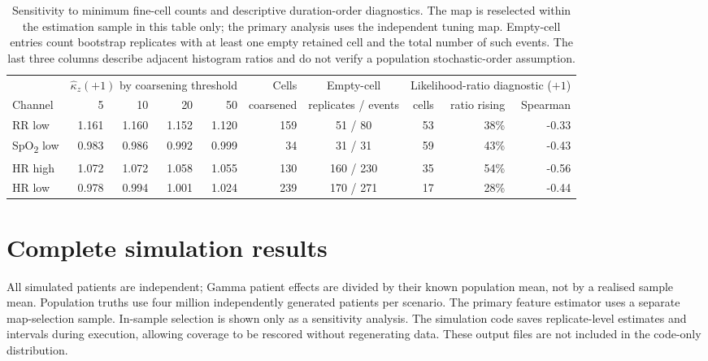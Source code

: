 \documentclass[11pt,letterpaper]{article}
\newcommand{\SpO}{SpO\textsubscript{2}}\newcommand{\tightnote}[1]{\par\smallskip{\footnotesize\raggedright #1\par}}
\begin{document}
\begin{table}[htbp]\centering\footnotesize
\setlength{\tabcolsep}{4pt}
\caption{Sensitivity to minimum fine-cell counts and descriptive duration-order diagnostics. The map is reselected within the estimation sample in this table only; the primary analysis uses the independent tuning map. Empty-cell entries count bootstrap replicates with at least one empty retained cell and the total number of such events. The last three columns describe adjacent histogram ratios and do not verify a population stochastic-order assumption.}
\label{tab:impl}
\begin{tabular}{@{}lrrrrrcrrr@{}}
\toprule
 & \multicolumn{4}{c}{$\hat\kappa_z(+1)$ by coarsening threshold} & Cells & Empty-cell & \multicolumn{3}{c}{Likelihood-ratio diagnostic ($+1$)} \\
\cmidrule(lr){2-5}\cmidrule(lr){6-6}\cmidrule(lr){7-7}\cmidrule(lr){8-10}
Channel & 5 & 10 & 20 & 50 & coarsened & replicates / events & cells & ratio rising & Spearman \\
\midrule
RR low & 1.161 & 1.160 & 1.152 & 1.120 & 159 & 51 / 80 & 53 & 38\% & -0.33 \\
\SpO{} low & 0.983 & 0.986 & 0.992 & 0.999 & 34 & 31 / 31 & 59 & 43\% & -0.43 \\
HR high & 1.072 & 1.072 & 1.058 & 1.055 & 130 & 160 / 230 & 35 & 54\% & -0.56 \\
HR low & 0.978 & 0.994 & 1.001 & 1.024 & 239 & 170 / 271 & 17 & 28\% & -0.44 \\
\bottomrule
\end{tabular}
\end{table}



\section{Complete simulation results}\label{s:simsupp}
All simulated patients are independent; Gamma patient effects are divided by their known population mean, not by a realised sample mean. Population truths use four million independently generated patients per scenario. The primary feature estimator uses a separate map-selection sample. In-sample selection is shown only as a sensitivity analysis. The simulation code saves replicate-level estimates and intervals during execution, allowing coverage to be rescored without regenerating data. These output files are not included in the code-only distribution.
\end{document}
